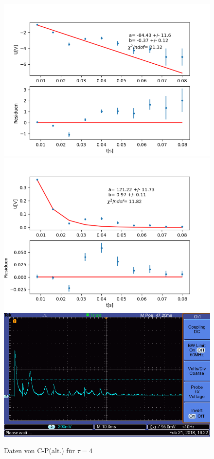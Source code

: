 \documentclass[12pt,a4paper]{article}
\begin{document}
\begin{figure}
\centering
\includegraphics[scale=0.5]{Bilder/T2Anhang/T2CPlin.png}
\includegraphics[scale=0.5]{Bilder/T2Anhang/T2CPexp.png}
\includegraphics[scale=0.5]{Bilder/T2Anhang/T2CP.png}
\caption{Daten von C-P(alt.) für $\tau = 4$}
\end{figure}
\end{document}
